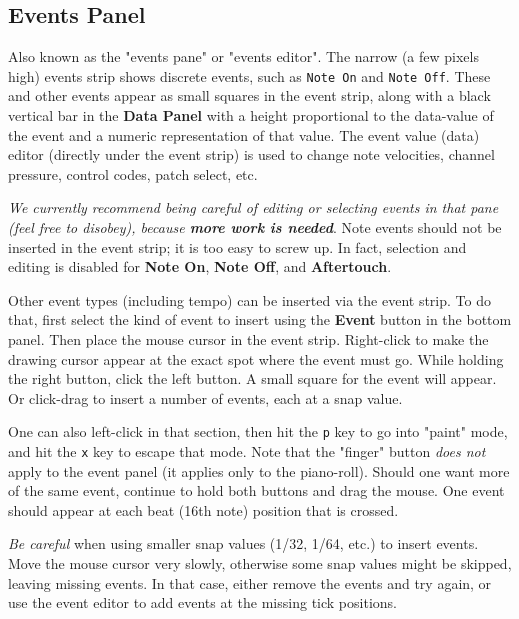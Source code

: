 \subsection{Events Panel}
\label{subsec:pattern_editor_panel}

   Also known as the "events pane" or "events editor".
   The narrow (a few pixels high) events strip shows discrete events,
   such as \texttt{Note On} and \texttt{Note Off}.
   These and other events appear
   as small squares in the event strip, along with a black vertical bar
   in the \textbf{Data Panel} with a
   height proportional to the data-value of the event and a numeric
   representation of that value.
	The event value (data) editor (directly under the event strip) is used 
	to change note velocities, channel pressure, control codes,
	patch select, etc.

   \textsl{We currently recommend being careful of editing or selecting events
   in that pane (feel free to disobey), because
   \textbf{more work is needed}}.
   Note events should not be inserted in the event strip; it is too easy to
   screw up.  In fact, selection and editing is disabled for
   \textbf{Note On}, \textbf{Note Off}, and \textbf{Aftertouch}.

   Other event types (including tempo) can be inserted via the event strip.
   To do that, first select the kind of event to insert using the
   \textbf{Event} button in the bottom panel.
   Then place the mouse cursor in the event strip.
   Right-click to make the drawing cursor appear at the exact spot where the
   event must go.  While holding the right button, click the left button.
   A small square for the event will appear. Or click-drag to insert a number
   of events, each at a snap value.

   One can also left-click in that section,
   then hit the \texttt{p} key to go into "paint" mode,
   and hit the \texttt{x} key to escape that mode.
   Note that the "finger" button \textsl{does not} apply to the event panel (it
   applies only to the piano-roll).
   Should one want more of the same event, continue to hold both buttons and
   drag the mouse.  One event should appear at each beat (16th note) position
   that is crossed.

   \textsl{Be careful}
   when using smaller snap values (1/32, 1/64, etc.) to insert events.
   Move the mouse cursor very slowly, otherwise some snap values might be
   skipped, leaving missing events.  In that case, either remove the events and
   try again, or use the event editor to add events at the missing tick
   positions.

